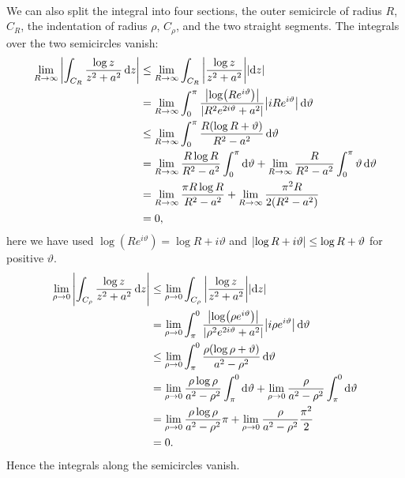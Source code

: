 \documentclass{article}
\begin{document}
\begin{example}
\begin{align*}
        \end{align*}
        We can also split the integral into four sections, the outer semicircle of radius \(R\), \(C_R\), the indentation of radius \(\rho\), \(C_\rho\), and the two straight segments.
        The integrals over the two semicircles vanish:
        \begin{align*}
            \lim_{R\to\infty} \abs{\int_{C_R} \frac{\log z}{z^2 + a^2} \dd{z}} &\le \lim_{R\to\infty} \int_{C_R} \abs{\frac{\log z}{z^2 + a^2}}\abs{\dd{z}}\\
            &= \lim_{R\to\infty} \int_{0}^{\pi} \frac{\abs{\log(Re^{i\vartheta})}}{\abs{R^2e^{2i\vartheta} + a^2}}\abs{iRe^{i\vartheta}}\dd{\vartheta}\\
            &\le \lim_{R\to\infty} \int_{0}^{\pi} \frac{R(\log R + \vartheta)}{R^2 - a^2}\dd{\vartheta}\\
            &= \lim_{R\to\infty} \frac{R\log R}{R^2 - a^2}\int_{0}^{\pi} \dd{\vartheta} + \lim_{R\to\infty} \frac{R}{R^2 - a^2} \int_{0}^{\pi} \vartheta \dd{\vartheta}\\
            &= \lim_{R\to\infty} \frac{\pi R\log R}{R^2 - a^2} + \lim_{R\to\infty} \frac{\pi^2 R}{2(R^2 - a^2)}\\
            &= 0,
        \end{align*}
        here we have used \(\log(Re^{i\vartheta}) = \log R + i\vartheta\) and \(\abs{\log R + i\vartheta} \le \log R + \vartheta\) for positive \(\vartheta\).
        \begin{align*}
            \lim_{\rho\to 0} \abs{\int_{C_\rho} \frac{\log z}{z^2 + a^2}\dd{z}} &\le \lim_{\rho\to 0} \int_{C_\rho} \abs{\frac{\log z}{z^2 + a^2}} \abs{\dd{z}}\\
            &= \lim_{\rho\to 0} \int_{\pi}^{0} \frac{\abs{\log(\rho e^{i\vartheta})}}{\abs{\rho^2e^{2i\vartheta} + a^2}} \abs{i\rho e^{i\vartheta}}\dd{\vartheta}\\
            &\le \lim_{\rho\to 0} \int_{\pi}^{0} \frac{\rho(\log\rho + \vartheta)}{a^2 - \rho^2} \dd{\vartheta}\\
            &= \lim_{\rho\to 0}  \frac{\rho\log \rho}{a^2 - \rho^2} \int_{\pi}^{0} \dd{\vartheta} + \lim_{\rho\to 0} \frac{\rho}{a^2 - \rho^2} \int_{\pi}^{0}\dd{\vartheta}\\
            &= \lim_{\rho\to 0} \frac{\rho\log \rho}{a^2 - \rho^2}\pi + \lim_{\rho\to 0} \frac{\rho}{a^2 - \rho^2}\frac{\pi^2}{2}\\
            &= 0.
        \end{align*}
        Hence the integrals along the semicircles vanish.
        

\end{example}
\end{document}
